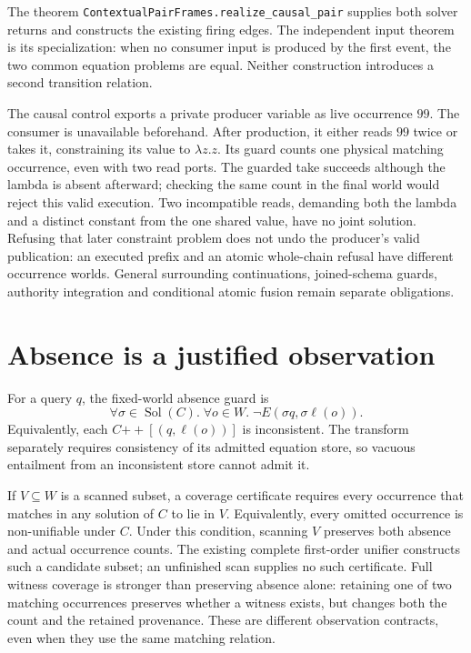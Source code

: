 \documentclass[11pt]{article}
\newcommand{\Sol}{\operatorname{Sol}}
\newcommand{\code}[1]{\texttt{\small #1}}
\begin{document}
The theorem \code{ContextualPairFrames.realize\_causal\_pair} supplies both
solver returns and constructs the existing firing edges. The independent
input theorem is its specialization: when no consumer input is produced by
the first event, the two common equation problems are equal. Neither
construction introduces a second transition relation.

The causal control exports a private producer variable as live occurrence
$99$. The consumer is unavailable beforehand. After production, it either
reads $99$ twice or takes it, constraining its value to $\lambda z.z$.
Its guard counts one physical matching occurrence, even with two read ports.
The guarded take succeeds although the lambda is absent afterward; checking
the same count in the final world would reject this valid execution.
Two incompatible reads, demanding both the lambda and a distinct constant
from the one shared value, have no joint solution. Refusing that later
constraint problem does not undo the producer's valid publication: an
executed prefix and an atomic whole-chain refusal have different occurrence
worlds. General surrounding continuations, joined-schema guards, authority
integration and conditional atomic fusion remain separate obligations.

\section{Absence is a justified observation}

For a query $q$, the fixed-world absence guard is
\[
 \forall\sigma\in\Sol(C).\;\forall o\in W.\;
     \neg E(\sigma q,\sigma\ell(o)).
\]
Equivalently, each $C\mathbin{+\!+}[(q,\ell(o))]$ is inconsistent.
The transform separately requires consistency of its admitted equation
store, so vacuous entailment from an inconsistent store cannot admit it.

If $V\subseteq W$ is a scanned subset, a coverage certificate requires
every occurrence that matches in any solution of $C$ to lie in $V$.
Equivalently, every omitted occurrence is non-unifiable under $C$.
Under this condition, scanning $V$ preserves both absence and actual
occurrence counts. The existing complete first-order unifier constructs
such a candidate subset; an unfinished scan supplies no such certificate.
Full witness coverage is stronger than preserving absence alone: retaining
one of two matching occurrences preserves whether a witness exists, but
changes both the count and the retained provenance. These are different
observation contracts, even when they use the same matching relation.
\end{document}
